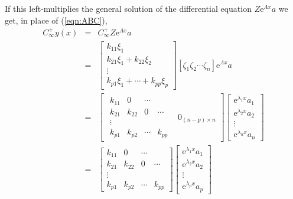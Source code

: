 \documentclass{article}
\begin{document}
If this left-multiplies the general solution of the differential
equation $Z\mathrm{e}^{\Lambda x}a$ we get, in place of
(\ref{eqn:ABC}),
\begin{eqnarray}
C_\infty^+ y(x) & = & C_\infty^+ Z \mathrm{e}^{\Lambda x} a 
\label{eqn:ABC_Schur} \\
& = & \left[\begin{array}{c}
        k_{11} \xi_1 \\
        k_{21} \xi_1 + k_{22} \xi_2 \\
        \vdots \\
        k_{p1} \xi_1 +\cdots + k_{pp} \xi_p
                \end{array}\right] \left[\zeta_1 \zeta_2\cdots \zeta_n\right]
\mathrm{e}^{\Lambda x} a  \\
& = & \left[
        \begin{array}{cc}
                {\begin{array}{ccccc}
                k_{11}  & 0 & \cdots  \\
                k_{21}  & k_{22}  & 0 & \cdots  \\
                \vdots \\
                k_{p1}  & k_{p2}  & \cdots & 
                k_{pp} 
                \end{array}}
        & 0_{(n-p)\times n}
        \end{array}
\right] \left[\begin{array}{c} 
                \mathrm{e}^{\lambda_1 x} a_1 \\
                \mathrm{e}^{\lambda_2 x} a_2 \\
                \vdots \\
                \mathrm{e}^{\lambda_n x} a_n
              \end{array}\right] \nonumber \\
& = & \left[
                {\begin{array}{ccccc}
                k_{11}  & 0 & \cdots  \\
                k_{21}  & k_{22}  & 0 & \cdots  \\
                \vdots \\
                k_{p1}  & k_{p2}  & \cdots & 
                k_{pp} 
                \end{array}}
\right] \left[\begin{array}{c} 
                \mathrm{e}^{\lambda_1 x} a_1 \\
                \mathrm{e}^{\lambda_2 x} a_2 \\
                \vdots \\
                \mathrm{e}^{\lambda_p x} a_p
              \end{array}\right] 
\end{eqnarray}
\end{document}

